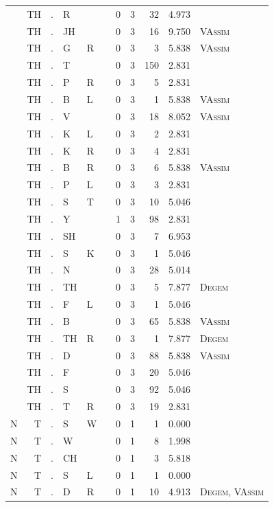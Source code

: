 \documentclass[12pt]{article}
\begin{document}
\begin{longtable}{r@{ } r@{ } c@{ } l@{ } l@{ } l@{ } r r r r l }
 & TH & . & R &  &  & 0 & 3 & 32 & 4.973 &  \\
 & TH & . & JH &  &  & 0 & 3 & 16 & 9.750 & \textsc{VAssim} \\
 & TH & . & G & R &  & 0 & 3 & 3 & 5.838 & \textsc{VAssim} \\
 & TH & . & T &  &  & 0 & 3 & 150 & 2.831 &  \\
 & TH & . & P & R &  & 0 & 3 & 5 & 2.831 &  \\
 & TH & . & B & L &  & 0 & 3 & 1 & 5.838 & \textsc{VAssim} \\
 & TH & . & V &  &  & 0 & 3 & 18 & 8.052 & \textsc{VAssim} \\
 & TH & . & K & L &  & 0 & 3 & 2 & 2.831 &  \\
 & TH & . & K & R &  & 0 & 3 & 4 & 2.831 &  \\
 & TH & . & B & R &  & 0 & 3 & 6 & 5.838 & \textsc{VAssim} \\
 & TH & . & P & L &  & 0 & 3 & 3 & 2.831 &  \\
 & TH & . & S & T &  & 0 & 3 & 10 & 5.046 &  \\
 & TH & . & Y &  &  & 1 & 3 & 98 & 2.831 &  \\
 & TH & . & SH &  &  & 0 & 3 & 7 & 6.953 &  \\
 & TH & . & S & K &  & 0 & 3 & 1 & 5.046 &  \\
 & TH & . & N &  &  & 0 & 3 & 28 & 5.014 &  \\
 & TH & . & TH &  &  & 0 & 3 & 5 & 7.877 & \textsc{Degem} \\
 & TH & . & F & L &  & 0 & 3 & 1 & 5.046 &  \\
 & TH & . & B &  &  & 0 & 3 & 65 & 5.838 & \textsc{VAssim} \\
 & TH & . & TH & R &  & 0 & 3 & 1 & 7.877 & \textsc{Degem} \\
 & TH & . & D &  &  & 0 & 3 & 88 & 5.838 & \textsc{VAssim} \\
 & TH & . & F &  &  & 0 & 3 & 20 & 5.046 &  \\
 & TH & . & S &  &  & 0 & 3 & 92 & 5.046 &  \\
 & TH & . & T & R &  & 0 & 3 & 19 & 2.831 &  \\
N & T & . & S & W &  & 0 & 1 & 1 & 0.000 &  \\
N & T & . & W &  &  & 0 & 1 & 8 & 1.998 &  \\
N & T & . & CH &  &  & 0 & 1 & 3 & 5.818 &  \\
N & T & . & S & L &  & 0 & 1 & 1 & 0.000 &  \\
N & T & . & D & R &  & 0 & 1 & 10 & 4.913 & \textsc{Degem}, \textsc{VAssim} \\

\end{longtable}
\end{document}
